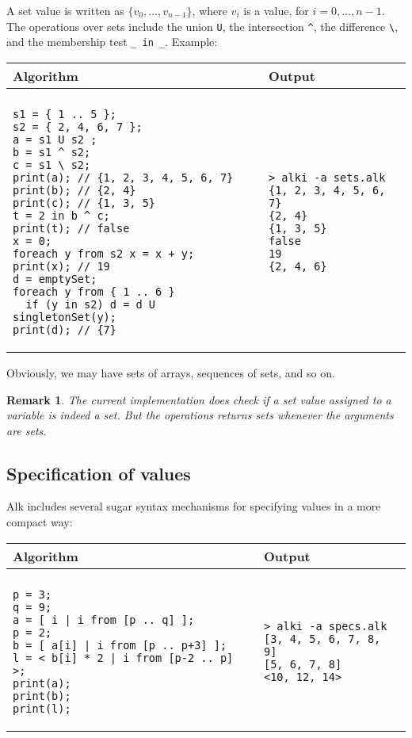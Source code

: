 \documentclass[a4paper]{report}
\newtheorem*{remark}{Remark}
\begin{document}
A set value is written as $\{ v_0,\ldots,v_{n-1}\}$, where $v_i$ is a value, for $i=0,\ldots,n-1$. The operations over sets include the union \verb|U|, the intersection \verb|^|, the difference \verb|\|, and the membership test \verb|_ in _|.
Example:
\begin{center}
\begin{tabular}{ll}
Algorithm & Output\\
\hline
\\
\begin{minipage}{.55\textwidth}
\begin{verbatim}
s1 = { 1 .. 5 };
s2 = { 2, 4, 6, 7 };
a = s1 U s2 ;
b = s1 ^ s2;
c = s1 \ s2;
print(a); // {1, 2, 3, 4, 5, 6, 7}
print(b); // {2, 4}
print(c); // {1, 3, 5}
t = 2 in b ^ c;
print(t); // false
x = 0;
foreach y from s2 x = x + y;
print(x); // 19
d = emptySet;
foreach y from { 1 .. 6 }
  if (y in s2) d = d U singletonSet(y);
print(d); // {7}
\end{verbatim}
\end{minipage}
&
\begin{minipage}{.45\textwidth}
\begin{verbatim}
> alki -a sets.alk 
{1, 2, 3, 4, 5, 6, 7}
{2, 4}
{1, 3, 5}
false
19
{2, 4, 6}
\end{verbatim}
\end{minipage}
\end{tabular}
\end{center}

Obviously, we may have sets of arrays, sequences of sets, and so on.

\begin{remark}
The current implementation does check if a set value assigned to a variable is indeed a set. But the operations returns sets whenever the arguments are sets.
\end{remark}

\subsection{Specification of values}

Alk includes several sugar syntax mechanisms for specifying values in a more compact way:
\begin{center}
\begin{tabular}{ll}
Algorithm & Output\\
\hline
\\
\begin{minipage}{.45\textwidth}
\begin{verbatim}
p = 3;
q = 9;
a = [ i | i from [p .. q] ];
p = 2;
b = [ a[i] | i from [p .. p+3] ];
l = < b[i] * 2 | i from [p-2 .. p] >;
print(a);
print(b);
print(l);
\end{verbatim}
\end{minipage}
&
\begin{minipage}{.45\textwidth}
\begin{verbatim}
> alki -a specs.alk
[3, 4, 5, 6, 7, 8, 9]
[5, 6, 7, 8]
<10, 12, 14>
\end{verbatim}
\end{minipage}
\end{tabular}
\end{center}
\end{document}
